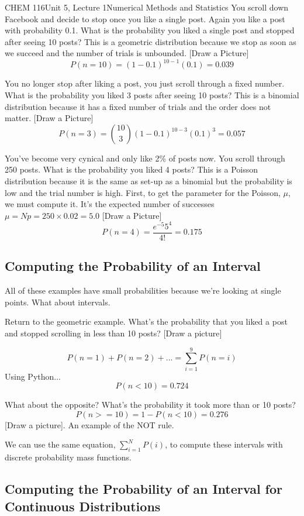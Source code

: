 \documentclass{article}
\begin{document}
\begin{tdoc}{CHEM 116}{Unit 5, Lecture 1}{Numerical Methods and Statistics}
You scroll down Facebook and decide to stop once you like a single
post. Again you like a post with probability 0.1. What is the
probability you liked a single post and stopped after seeing 10
posts? This is a geometric distribution because we stop as soon as we
succeed and the number of trials is unbounded. [Draw a Picture]
\[
P(n=10) = (1 - 0.1)^{10 - 1}(0.1) = 0.039
\]

You no longer stop after liking a post, you just scroll through a
fixed number. What is the probability you liked 3 posts after seeing
10 posts? This is a binomial distribution because it has a fixed
number of trials and the order does not matter. [Draw a Picture]
\[
P(n=3) = {10 \choose 3} (1 - 0.1)^{10 -3 }(0.1)^{3} = 0.057
\]

You've become very cynical and only like 2\% of posts now. You scroll
through 250 posts. What is the probability you liked 4 posts? This is
a Poisson distribution because it is the same as set-up as a binomial
but the probability is low and the trial number is high. First, to
get the parameter for the Poisson, $\mu$, we must compute it. It's
the expected number of successes $\mu = Np = 250 \times 0.02 = 5.0$
[Draw a Picture]
\[
P(n=4) = \frac{e^{-5}5^4}{4!} = 0.175
\]

 \subsection{Computing the Probability of an Interval}

 All of these examples have small probabilities because we're looking
 at single points. What about intervals.

Return to the geometric example. What's the probability that you liked
a post and stopped scrolling in less than 10 posts? [Draw a picture]

\[
P(n = 1) + P(n = 2) + ... = \sum_{i=1}^{9} P(n = i)
\]
Using Python...
\[
P(n < 10) = 0.724
\]

What about the opposite? What's the probability it took more than or
10 posts?
\[
P(n >= 10) = 1 - P(n < 10) = 0.276
\]
[Draw a picture]. An example of the NOT rule.

We can use the same equation, $\sum_{i=1}^N P(i)$, to compute these
intervals with discrete probability mass functions.

\subsection{Computing the Probability of an Interval for Continuous Distributions}


\end{tdoc}
\end{document}
